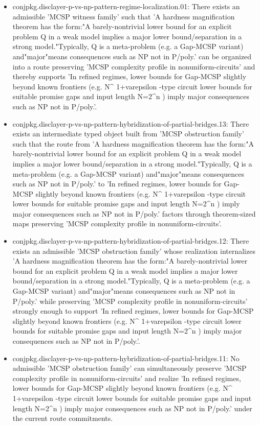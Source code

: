 \documentclass[11pt]{article}
\begin{document}
\begin{itemize}
\item conjpkg.disclayer-p-vs-np-pattern-regime-localization.01: There exists an admissible 'MCSP witness family' such that 'A hardness magnification theorem has the form:"A barely-nontrivial lower bound for an explicit problem Q in a weak model implies a major lower bound/separation in a strong model."Typically, Q is a meta-problem (e.g. a Gap-MCSP variant) and"major"means consequences such as NP not in P/poly.' can be organized into a route preserving 'MCSP complexity profile in nonuniform-circuits' and thereby supports 'In refined regimes, lower bounds for Gap-MCSP slightly beyond known frontiers (e.g. N\textasciicircum{} 1+varepsilon -type circuit lower bounds for suitable promise gaps and input length N=2\textasciicircum{}n ) imply major consequences such as NP not in P/poly.'.
\item conjpkg.disclayer-p-vs-np-pattern-hybridization-of-partial-bridges.13: There exists an intermediate typed object built from 'MCSP obstruction family' such that the route from 'A hardness magnification theorem has the form:"A barely-nontrivial lower bound for an explicit problem Q in a weak model implies a major lower bound/separation in a strong model."Typically, Q is a meta-problem (e.g. a Gap-MCSP variant) and"major"means consequences such as NP not in P/poly.' to 'In refined regimes, lower bounds for Gap-MCSP slightly beyond known frontiers (e.g. N\textasciicircum{} 1+varepsilon -type circuit lower bounds for suitable promise gaps and input length N=2\textasciicircum{}n ) imply major consequences such as NP not in P/poly.' factors through theorem-sized maps preserving 'MCSP complexity profile in nonuniform-circuits'.
\item conjpkg.disclayer-p-vs-np-pattern-hybridization-of-partial-bridges.12: There exists an admissible 'MCSP obstruction family' whose realization internalizes 'A hardness magnification theorem has the form:"A barely-nontrivial lower bound for an explicit problem Q in a weak model implies a major lower bound/separation in a strong model."Typically, Q is a meta-problem (e.g. a Gap-MCSP variant) and"major"means consequences such as NP not in P/poly.' while preserving 'MCSP complexity profile in nonuniform-circuits' strongly enough to support 'In refined regimes, lower bounds for Gap-MCSP slightly beyond known frontiers (e.g. N\textasciicircum{} 1+varepsilon -type circuit lower bounds for suitable promise gaps and input length N=2\textasciicircum{}n ) imply major consequences such as NP not in P/poly.'.
\item conjpkg.disclayer-p-vs-np-pattern-hybridization-of-partial-bridges.11: No admissible 'MCSP obstruction family' can simultaneously preserve 'MCSP complexity profile in nonuniform-circuits' and realize 'In refined regimes, lower bounds for Gap-MCSP slightly beyond known frontiers (e.g. N\textasciicircum{} 1+varepsilon -type circuit lower bounds for suitable promise gaps and input length N=2\textasciicircum{}n ) imply major consequences such as NP not in P/poly.' under the current route commitments.

\end{itemize}
\end{document}
